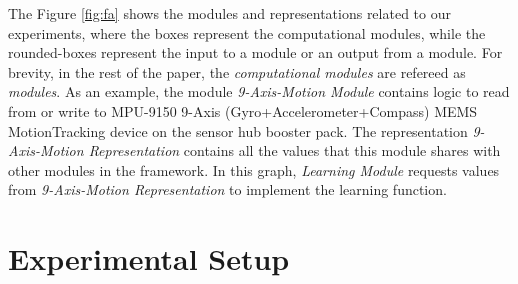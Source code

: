 \documentclass[letterpaper]{article}
\begin{document}
\begin{sloppy}
The Figure \ref{fig:fa} shows the modules and representations related to our 
experiments, where the boxes represent the computational modules, while the rounded-boxes represent 
the input to a module or an output from a module. For brevity, in the rest of the paper, the  
{\em computational modules} are refereed as  {\em modules}. As an example, the module {\em 
9-Axis-Motion Module} contains logic to read from or write to MPU-9150 9-Axis 
(Gyro+Accelerometer+Compass) MEMS MotionTracking device on the sensor hub booster pack. The 
representation {\em 9-Axis-Motion Representation} contains all the values that 
this module shares with other modules in the framework. In this graph, {\em 
Learning Module} requests values from {\em 9-Axis-Motion Representation} to implement the learning 
function. 
  


\section{Experimental Setup}


\end{sloppy}
\end{document}

